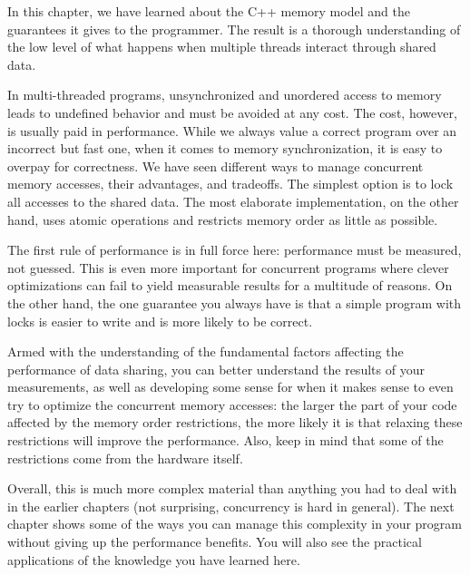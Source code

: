 In this chapter, we have learned about the C++ memory model and the guarantees it gives to the programmer. The result is a thorough understanding of the low level of what happens when multiple threads interact through shared data.

In multi-threaded programs, unsynchronized and unordered access to memory leads to undefined behavior and must be avoided at any cost. The cost, however, is usually paid in performance. While we always value a correct program over an incorrect but fast one, when it comes to memory synchronization, it is easy to overpay for correctness. We have seen different ways to manage concurrent memory accesses, their advantages, and tradeoffs. The simplest option is to lock all accesses to the shared data. The most elaborate implementation, on the other hand, uses atomic operations and restricts memory order as little as possible.

The first rule of performance is in full force here: performance must be measured, not guessed. This is even more important for concurrent programs where clever optimizations can fail to yield measurable results for a multitude of reasons. On the other hand, the one guarantee you always have is that a simple program with locks is easier to write and is more likely to be correct. 

Armed with the understanding of the fundamental factors affecting the performance of data sharing, you can better understand the results of your measurements, as well as developing some sense for when it makes sense to even try to optimize the concurrent memory accesses: the larger the part of your code affected by the memory order restrictions, the more likely it is that relaxing these restrictions will improve the performance. Also, keep in mind that some of the restrictions come from the hardware itself.

Overall, this is much more complex material than anything you had to deal with in the earlier chapters (not surprising, concurrency is hard in general). The next chapter shows some of the ways you can manage this complexity in your program without giving up the performance benefits. You will also see the practical applications of the knowledge you have learned here.





